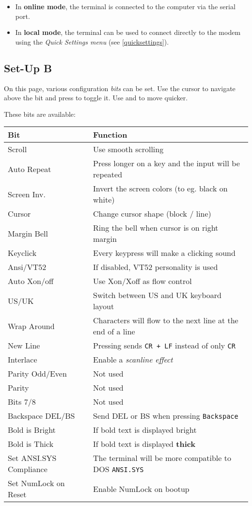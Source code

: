 \begin{itemize}[leftmargin=1em]
 \item In \textbf{online mode}, the terminal is connected to the computer via the serial port.\\
 \item In \textbf{local mode}, the terminal can be used to connect directly to the modem using the \textit{Quick Settings menu} (see \vref{quicksettings}).
\end{itemize}


\newpage
\subsection{Set-Up B}

On this page, various configuration \textit{bits} can be set. Use the cursor to navigate above the bit and press  to toggle it. Use \LKeyTab{} and \LKeyEnter{} to move quicker.

These bits are available:

\begin{tabular}{p{8em} | p{}}
\hline
\textbf{Bit}	& \textbf{Function} \\
\hline
Scroll			& Use smooth scrolling \\
Auto Repeat		& Press longer on a key and the input will be repeated \\
Screen Inv.		& Invert the screen colors (to eg. black on white) \\
Cursor			& Change cursor shape (block / line) \\
\hline
Margin Bell		& Ring the bell when cursor is on right margin \\
Keyclick		& Every keypress will make a clicking sound \\
Ansi/VT52		& If disabled, VT52 personality is used \\
Auto Xon/off	& Use Xon/Xoff as flow control \\
\hline
US/UK			& Switch between US and UK keyboard layout \\
Wrap Around		& Characters will flow to the next line at the end of a line \\
New Line		& Pressing \LKeyEnter{} sends \texttt{CR + LF} instead of only \texttt{CR} \\
Interlace		& Enable a \textit{scanline effect} \\
\hline
Parity Odd/Even	& Not used \\
Parity			& Not used \\
Bits 7/8		& Not used \\
Backspace DEL/BS	& Send DEL or BS when pressing \texttt{Backspace} \\
\hline
Bold is Bright	& If bold text is displayed bright \\
Bold is Thick	& If bold text is displayed \textbf{thick} \\
Set ANSI.SYS Compliance	& The terminal will be more compatible to DOS \texttt{ANSI.SYS} \\
Set NumLock on Reset	& Enable NumLock on bootup \\
\hline
\end{tabular}

